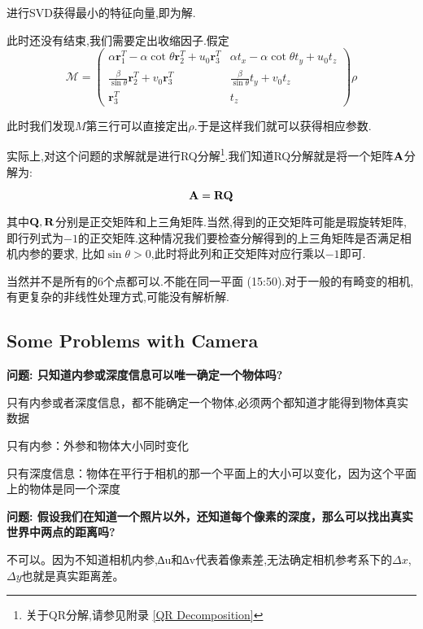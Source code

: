 进行SVD获得最小的特征向量,即为解.

此时还没有结束,我们需要定出收缩因子.假定
\begin{equation}
	\mathcal{M}=\left(\begin{array}{cc}
		\alpha \boldsymbol{r}_{1}^{T}-\alpha \cot \theta \boldsymbol{r}_{2}^{T}+u_{0} \boldsymbol{r}_{3}^{T} & \alpha t_{x}-\alpha \cot \theta t_{y}+u_{0} t_{z} \\
		\frac{\beta}{\sin \theta} \boldsymbol{r}_{2}^{T}+v_{0} \boldsymbol{r}_{3}^{T} & \frac{\beta}{\sin \theta} t_{y}+v_{0} t_{z} \\
		\boldsymbol{r}_{3}^{T} & t_{z}
	\end{array}\right) \rho
\end{equation}

此时我们发现$M$第三行可以直接定出$\rho$.于是这样我们就可以获得相应参数.

实际上,对这个问题的求解就是进行RQ分解\footnote{关于QR分解,请参见附录 \ref{QR Decomposition}}.我们知道RQ分解就是将一个矩阵$\bold{A}$分解为:

\begin{equation}
	\bold{A} =  \bold{R} \bold{Q}
\end{equation}

其中$\bold{Q}, \bold{R}$分别是正交矩阵和上三角矩阵.当然,得到的正交矩阵可能是瑕旋转矩阵,
即行列式为$-1$的正交矩阵.这种情况我们要检查分解得到的上三角矩阵是否满足相机内参的要求,
比如$\sin \theta > 0$,此时将此列和正交矩阵对应行乘以$-1$即可.

当然并不是所有的6个点都可以.不能在同一平面 (15:50).对于一般的有畸变的相机,有更复杂的非线性处理方式,可能没有解析解.

\subsection{Some Problems with Camera}

\textbf{问题: 只知道内参或深度信息可以唯一确定一个物体吗?}

只有内参或者深度信息，都不能确定一个物体,必须两个都知道才能得到物体真实数据

只有内参：外参和物体大小同时变化

只有深度信息：物体在平行于相机的那一个平面上的大小可以变化，因为这个平面上的物体是同一个深度

\textbf{问题: 假设我们在知道一个照片以外，还知道每个像素的深度，那么可以找出真实世界中两点的距离吗?}

不可以。因为不知道相机内参,∆u和∆v代表着像素差,无法确定相机参考系下的$\Delta x$,$\Delta y$也就是真实距离差。

